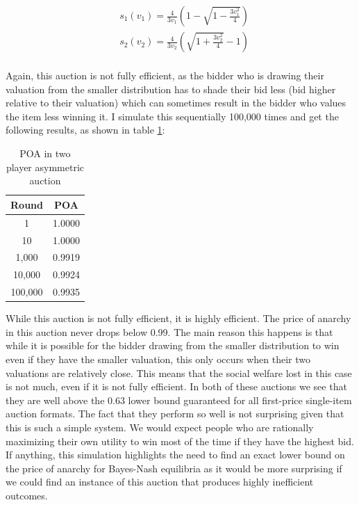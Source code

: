\documentclass[12pt,twoside]{reedthesis}
\begin{document}
\begin{align*}
&s_1(v_1) = \frac{4}{3 v_1} \left(1 - \sqrt{1 - \frac{3v_1^2}{4}}\right)\\
&s_2(v_2) = \frac{4}{3 v_2} \left(\sqrt{1 + \frac{3v_2^2}{4}} - 1 \right)\\
\end{align*}

Again, this auction is not fully efficient, as the bidder who is drawing their valuation from the smaller distribution has to shade their bid less (bid higher relative to their valuation) which can sometimes result in the bidder who values the item less winning it. I simulate this sequentially 100,000 times and get the following results, as shown in table \ref{table:2}:
\begin{table}[h!]
	\begin{center}
		\begin{tabular}{ |c|c| }
			\hline
			Round & POA \\
			\hline
			1 & 1.0000 \\
			10 & 1.0000 \\
			1,000 & 0.9919 \\
			10,000 & 0.9924 \\
			100,000 & 0.9935 \\
			\hline
		\end{tabular}
		\caption{POA in two player asymmetric auction}
		\label{table:2}
	\end{center} 
\end{table}

While this auction is not fully efficient, it is highly efficient. The price of anarchy in this auction never drops below 0.99. The main reason this happens is that while it is possible for the bidder drawing from the smaller distribution to win even if they have the smaller valuation, this only occurs when their two valuations are relatively close. This means that the social welfare lost in this case is not much, even if it is not fully efficient. In both of these auctions we see that they are well above the $0.63$ lower bound guaranteed for all first-price single-item auction formats. The fact that they perform so well is not surprising given that this is such a simple system. We would expect people who are rationally maximizing their own utility to win most of the time if they have the highest bid. If anything, this simulation highlights the need to find an exact lower bound on the price of anarchy for Bayes-Nash equilibria as it would be more surprising if we could find an instance of this auction that produces highly inefficient outcomes.
\end{document}
